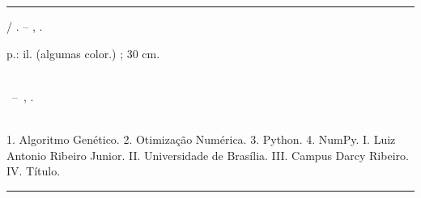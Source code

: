 \begin{fichacatalografica}
  \vspace*{\fill}                   %
  \hrule                            %
  \begin{center}                    %
    \begin{minipage}[c]{12.5cm}     %
      
      \imprimirautor
      
      \hspace{0.5cm} \imprimirtitulo  / \imprimirautor. --
      \imprimirlocal, \imprimirdata.
      
      \hspace{0.5cm} \pageref{LastPage} p.: il. (algumas color.) ; 30 cm.\\
      
      \hspace{0.5cm} \imprimirorientadorRotulo~\imprimirorientador\\
      
      \hspace{0.5cm}
      \parbox[t]{\textwidth}{\imprimirtipotrabalho~--~\imprimirinstituicao,
        \imprimirdata.}\\
      
      \hspace{0.5cm}
      1. Algoritmo Genético.
      2. Otimização Numérica.
      3. Python.
      4. NumPy.
      I. Luiz Antonio Ribeiro Junior.
      II. Universidade de Brasília.
      III. Campus Darcy Ribeiro.
      IV. Título.\\
      
      
    \end{minipage}
  \end{center}
  \hrule
\end{fichacatalografica}